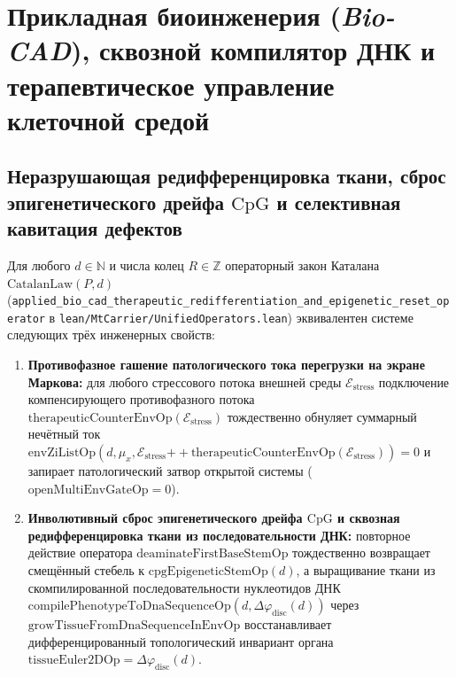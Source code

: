 \chapter{Прикладная биоинженерия (\emph{Bio-CAD}), сквозной компилятор ДНК и терапевтическое управление клеточной средой}
\label{ch:applied-bio-cad-therapy}

\section{Неразрушающая редифференцировка ткани, сброс эпигенетического дрейфа \texorpdfstring{$\mathrm{CpG}$}{CpG} и селективная кавитация дефектов}
\label{sec:applied-therapeutic-redifferentiation}

\begin{theorem}
\label{thm:applied-bio-cad-and-therapy}
Для любого $d\in\mathbb{N}$ и числа колец $R\in\mathbb{Z}$ операторный закон Каталана $\mathrm{CatalanLaw}(P,d)$ (\texttt{applied\_bio\_cad\_therapeutic\_redifferentiation\_and\_epigenetic\_reset\_operator} в \texttt{lean/MtCarrier/UnifiedOperators.lean}) эквивалентен системе следующих трёх инженерных свойств:
\begin{enumerate}[label=\textbf{(\roman*)},leftmargin=*]
\item \textbf{Противофазное гашение патологического тока перегрузки на экране Маркова:}
  для любого стрессового потока внешней среды $\mathcal{E}_{\mathrm{stress}}$ подключение компенсирующего противофазного потока $\mathrm{therapeuticCounterEnvOp}(\mathcal{E}_{\mathrm{stress}})$ тождественно обнуляет суммарный нечётный ток $\mathrm{envZiListOp}(d,\mu_x,\mathcal{E}_{\mathrm{stress}}\mathbin{++}\mathrm{therapeuticCounterEnvOp}(\mathcal{E}_{\mathrm{stress}})) = 0$ и запирает патологический затвор открытой системы ($\mathrm{openMultiEnvGateOp} = 0$).
\item \textbf{Инволютивный сброс эпигенетического дрейфа $\mathrm{CpG}$ и сквозная редифференцировка ткани из последовательности ДНК:}
  повторное действие оператора $\mathrm{deaminateFirstBaseStemOp}$ тождественно возвращает смещённый стебель к $\mathrm{cpgEpigeneticStemOp}(d)$, а выращивание ткани из скомпилированной последовательности нуклеотидов ДНК $\mathrm{compilePhenotypeToDnaSequenceOp}(d,\Delta\varphi_{\mathrm{disc}}(d))$ через $\mathrm{growTissueFromDnaSequenceInEnvOp}$ восстанавливает дифференцированный топологический инвариант органа $\mathrm{tissueEuler2DOp} = \Delta\varphi_{\mathrm{disc}}(d)$.

\end{enumerate}
\end{theorem}

